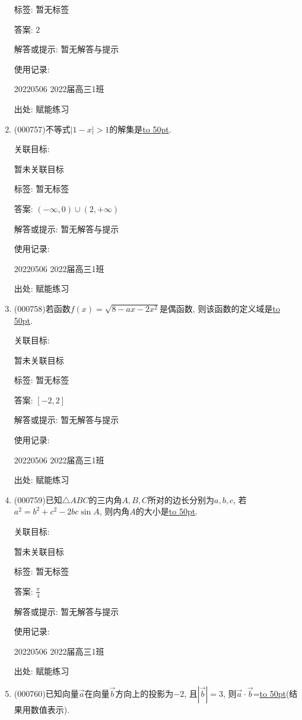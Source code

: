 \documentclass[10pt,a4paper]{article}
\newcommand{\blank}[1]{\underline{\hbox to #1pt{}}}
\begin{document}
\begin{enumerate}[1.]
标签: 暂无标签

答案: $2$

解答或提示: 暂无解答与提示

使用记录:

20220506	2022届高三1班	


出处: 赋能练习
\item { (000757)}不等式$|1-x|>1$的解集是\blank{50}.


关联目标:

暂未关联目标



标签: 暂无标签

答案: $(-\infty ,0)\cup (2,+\infty)$

解答或提示: 暂无解答与提示

使用记录:

20220506	2022届高三1班	


出处: 赋能练习
\item { (000758)}若函数$f(x)=\sqrt{8-ax-2x^2}$是偶函数, 则该函数的定义域是\blank{50}.


关联目标:

暂未关联目标



标签: 暂无标签

答案: $[-2,2]$

解答或提示: 暂无解答与提示

使用记录:

20220506	2022届高三1班	


出处: 赋能练习
\item { (000759)}已知$\triangle ABC$的三内角$A,B,C$所对的边长分别为$a,b,c$, 若$a^2=b^2+c^2-2bc\sin A$, 则内角$A$的大小是\blank{50}.


关联目标:

暂未关联目标



标签: 暂无标签

答案: $\frac{\pi}4$

解答或提示: 暂无解答与提示

使用记录:

20220506	2022届高三1班	


出处: 赋能练习
\item { (000760)}已知向量$\overrightarrow a$在向量$\overrightarrow b$方向上的投影为$-2$, 且$|\overrightarrow b|=3$, 则$\overrightarrow a\cdot \overrightarrow b$=\blank{50}(结果用数值表示).



\end{enumerate}
\end{document}
